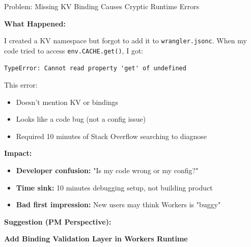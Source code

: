 \documentclass[11pt,a4paper]{article}
\begin{document}
\begin{insightbox}{Problem: Missing KV Binding Causes Cryptic Runtime Errors}

\textbf{What Happened:}

I created a KV namespace but forgot to add it to \texttt{wrangler.jsonc}. When my code tried to access \texttt{env.CACHE.get()}, I got:

\begin{verbatim}
TypeError: Cannot read property 'get' of undefined
\end{verbatim}

This error:
\begin{itemize}
    \item Doesn't mention KV or bindings
    \item Looks like a code bug (not a config issue)
    \item Required 10 minutes of Stack Overflow searching to diagnose
\end{itemize}

\vspace{0.5em}

\textbf{Impact:}
\begin{itemize}
    \item \textbf{Developer confusion:} "Is my code wrong or my config?"
    \item \textbf{Time sink:} 10 minutes debugging setup, not building product
    \item \textbf{Bad first impression:} New users may think Workers is "buggy"
\end{itemize}

\end{insightbox}

\textbf{Suggestion (PM Perspective):}

\textcolor{cfOrange}{\textbf{Add Binding Validation Layer in Workers Runtime}}
\end{document}
